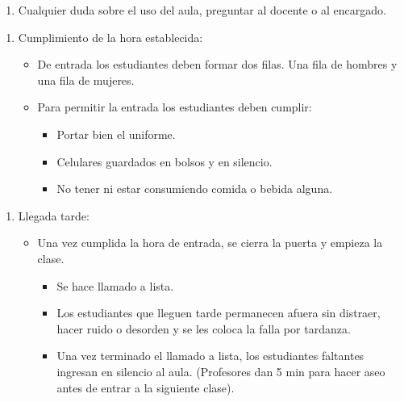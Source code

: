 \documentclass[letterpaper,10pt,spanish]{sphinxmanual}
\begin{document}
\begin{enumerate}
%
\setcounter{enumi}{3}
\item {} 
\sphinxAtStartPar
Cualquier duda sobre el uso del aula, preguntar al docente o al encargado.

\end{enumerate}
\begin{enumerate}
%
\setcounter{enumi}{4}
\item {} 
\sphinxAtStartPar
Cumplimiento de la hora establecida:
\begin{itemize}
\item {} 
\sphinxAtStartPar
De entrada los estudiantes deben formar dos filas. Una fila de hombres y una fila de mujeres.

\item {} 
\sphinxAtStartPar
Para permitir la entrada los estudiantes deben cumplir:
\begin{itemize}
\item {} 
\sphinxAtStartPar
Portar bien el uniforme.

\item {} 
\sphinxAtStartPar
Celulares guardados en bolsos y en silencio.

\item {} 
\sphinxAtStartPar
No tener ni estar consumiendo comida o bebida alguna.

\end{itemize}

\end{itemize}

\end{enumerate}
\begin{enumerate}
%
\setcounter{enumi}{5}
\item {} 
\sphinxAtStartPar
Llegada tarde:
\begin{itemize}
\item {} 
\sphinxAtStartPar
Una vez cumplida la hora de entrada, se cierra la puerta y empieza la clase.
\begin{itemize}
\item {} 
\sphinxAtStartPar
Se hace llamado a lista.

\item {} 
\sphinxAtStartPar
Los estudiantes que lleguen tarde permanecen afuera sin distraer, hacer ruido o desorden y se les coloca la falla por tardanza.

\item {} 
\sphinxAtStartPar
Una vez terminado el llamado a lista, los estudiantes faltantes ingresan en silencio al aula. (Profesores dan 5 min para hacer aseo antes de entrar a la siguiente clase).

\end{itemize}

\end{itemize}

\end{enumerate}
\end{document}
